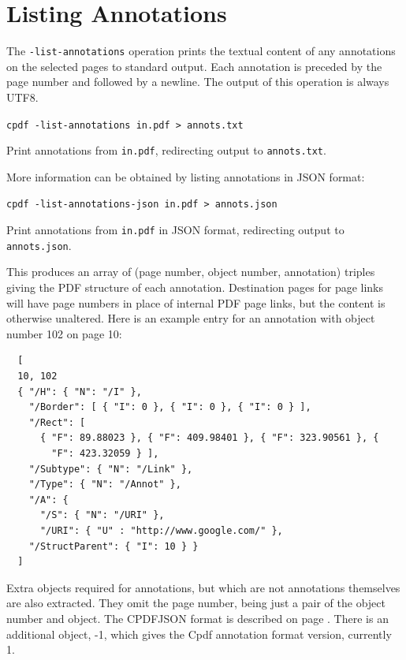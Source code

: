 \documentclass{book}
\begin{document}
  \section{Listing Annotations}
  The \texttt{-list-annotations} operation prints the textual content of any
annotations on the selected pages to standard output. Each annotation is preceded by the page number and followed by a newline. The output of this operation is always UTF8.
  \begin{framed}
    \noindent\small\verb!cpdf -list-annotations in.pdf > annots.txt!
    
    \vspace{2.5mm}
    \noindent Print annotations from \texttt{in.pdf}, redirecting output to \texttt{annots.txt}.
  \end{framed}

\noindent More information can be obtained by listing annotations in JSON format:

  \begin{framed}
    \noindent\small\verb!cpdf -list-annotations-json in.pdf > annots.json!
    
    \vspace{2.5mm}
    \noindent Print annotations from \texttt{in.pdf} in JSON format, redirecting output to \texttt{annots.json}.
  \end{framed}

\noindent This produces an array of (page number, object number, annotation) triples giving the PDF structure of each annotation. Destination pages for page links will have page numbers in place of internal PDF page links, but the content is otherwise unaltered. Here is an example entry for an annotation with object number 102 on page 10:

{\small\begin{verbatim}
  [
  10, 102
  { "/H": { "N": "/I" },
    "/Border": [ { "I": 0 }, { "I": 0 }, { "I": 0 } ],
    "/Rect": [
      { "F": 89.88023 }, { "F": 409.98401 }, { "F": 323.90561 }, {
        "F": 423.32059 } ],
    "/Subtype": { "N": "/Link" },
    "/Type": { "N": "/Annot" },
    "/A": {
      "/S": { "N": "/URI" },
      "/URI": { "U" : "http://www.google.com/" },
    "/StructParent": { "I": 10 } }
  ]
\end{verbatim}}

\noindent Extra objects required for annotations, but which are not annotations themselves are also extracted. They omit the page number, being just a pair of the object number and object. The CPDFJSON format is described on page \pageref{cpdfjson}. There is an additional object, -1, which gives the Cpdf annotation format version, currently 1.
\end{document}
